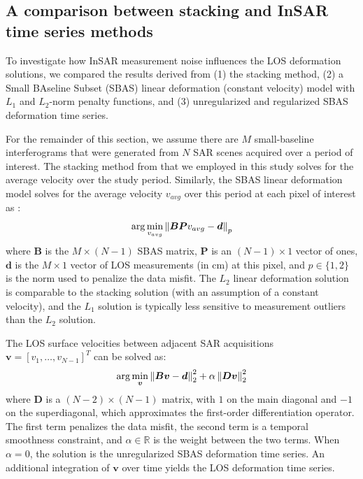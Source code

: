 \subsection{A comparison between stacking and InSAR time series methods}
\label{sec:method-compare}
To investigate how InSAR measurement noise influences the LOS deformation solutions, we compared the results derived from (1) the stacking method, (2) a Small BAseline Subset (SBAS) linear deformation (constant velocity) model with $L_1$ and $L_2$-norm penalty functions, and (3) unregularized and regularized SBAS deformation time series. 

For the remainder of this section, we assume there are $M$ small-baseline interferograms that were generated from $N$ SAR scenes acquired over a period of interest. The stacking method from \cite{Sandwell1998PhaseGradientApproach} that we employed in this study solves for the average velocity over the study period. Similarly, the SBAS linear deformation model solves for the average velocity $ v_{avg} $ over this period at each pixel of interest as \citep{Berardino2002NewAlgorithmSurface}:
\begin{equation}
	\arg \min_{v_{avg}} \left\lVert \bm{BP} v_{avg} - \bm{d}   \right\rVert_p
	\label{eq:sbas-linear}
\end{equation}
where $ \bm{B }$ is the $ M \times (N-1) $ SBAS matrix, $ \bm{P}$ is an $ (N-1) \times 1 $ vector of ones, $ \bm{d} $ is the $ M \times 1 $ vector of LOS measurements (in cm) at this pixel, and $ p \in \{1, 2\} $ is the norm used to penalize the data misfit. The $L_2$ linear deformation solution is comparable to the stacking solution (with an assumption of a constant velocity), and the $L_1$ solution is typically less sensitive to measurement outliers than the $L_2$ solution.

The LOS surface velocities between adjacent SAR acquisitions $ \bm{v} = \left[v_1 , \ldots , v_{N-1} \right]^T $ can be solved as:
\begin{equation}
	\arg \min_{\bm{v} } \left\lVert \bm{Bv} - \bm{d}   \right\rVert^2_2 + \alpha \left\lVert \bm{Dv} \right\rVert^2_2  \label{eq:sbas}
\end{equation}
where $ \bm{D} $ is a $ (N-2) \times (N-1) $ matrix, with $1$ on the main diagonal and $-1$ on the superdiagonal, which approximates the first-order differentiation operator. The first term penalizes the data misfit, the second term is a temporal smoothness constraint, and $ \alpha \in \mathbb{R} $ is the weight between the two terms. When $ \alpha = 0 $, the solution is the unregularized SBAS deformation time series. An additional integration of $\mathbf{v}$ over time yields the LOS deformation time series.

